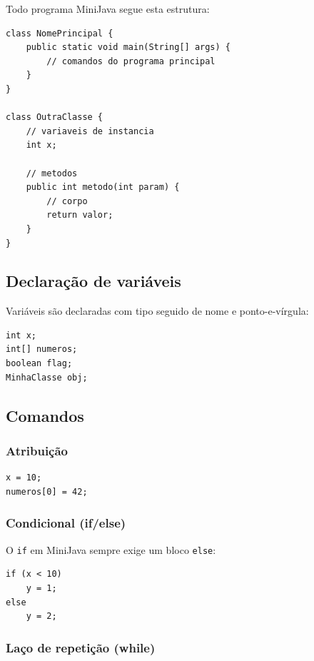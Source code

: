 \documentclass[a4paper, 12pt]{article}
\begin{document}
Todo programa MiniJava segue esta estrutura:

\begin{lstlisting}[style=minijava, caption={Estrutura b\'asica de um programa MiniJava}]
class NomePrincipal {
    public static void main(String[] args) {
        // comandos do programa principal
    }
}

class OutraClasse {
    // variaveis de instancia
    int x;

    // metodos
    public int metodo(int param) {
        // corpo
        return valor;
    }
}
\end{lstlisting}

\subsection{Declara\c{c}\~ao de vari\'aveis}

Vari\'aveis s\~ao declaradas com tipo seguido de nome e ponto-e-v\'irgula:

\begin{lstlisting}[style=minijava, caption={Declara\c{c}\~ao de vari\'aveis}]
int x;
int[] numeros;
boolean flag;
MinhaClasse obj;
\end{lstlisting}

\subsection{Comandos}

\subsubsection{Atribui\c{c}\~ao}

\begin{lstlisting}[style=minijava, caption={Atribui\c{c}\~oes}]
x = 10;
numeros[0] = 42;
\end{lstlisting}

\subsubsection{Condicional (if/else)}

O \texttt{if} em MiniJava sempre exige um bloco \texttt{else}:

\begin{lstlisting}[style=minijava, caption={Estrutura condicional}]
if (x < 10)
    y = 1;
else
    y = 2;
\end{lstlisting}

\subsubsection{La\c{c}o de repeti\c{c}\~ao (while)}
\end{document}
